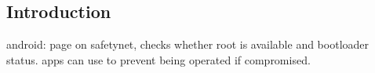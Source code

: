 
\subsection{Introduction}

android: page on safetynet, checks whether root is available and bootloader status. apps can use to prevent being operated if compromised.


